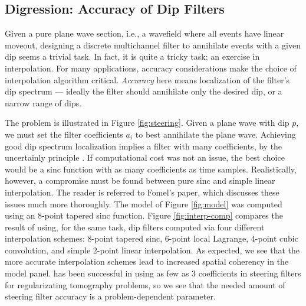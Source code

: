 

\subsection{Digression: Accuracy of Dip Filters}

Given a pure plane wave section, i.e., a wavefield where all events have linear 
moveout, designing a discrete multichannel filter to annihilate events with a given
dip seems a trivial task.  In fact, it is quite a tricky task; an exercise in
interpolation.  For many applications, accuracy considerations make the choice of 
interpolation algorithm critical.  {\em Accuracy} here means localization of the
filter's dip spectrum --- ideally the filter should annihilate only the desired
dip, or a narrow range of dips.  



The problem is illustrated in Figure \ref{fig:steering}.  Given a plane wave with
dip $p$, we must set the filter coefficients $a_i$ to best annihilate the plane wave.
Achieving good dip spectrum localization implies a filter with many coefficients, by the 
uncertainly principle \cite[]{bracewell}.  If computational cost was not an issue, the best
choice would be a sinc function with as many coefficients as time samples.
Realistically, however, a compromise must be found between pure sinc and 
simple linear interpolation.  The reader is referred to Fomel's  
paper, which discusses these issues much more
thoroughly.  The model of Figure \ref{fig:model} was computed using an 8-point
tapered sinc function.  Figure \ref{fig:interp-comp} compares
the result of using, for the same task,  dip filters computed via four different
interpolation schemes: 8-point tapered sinc, 6-point local Lagrange, 4-point cubic convolution,
and simple 2-point linear interpolation.  As expected, we see that the more 
accurate interpolation schemes lead to increased spatial coherency in the model panel.
\cite{Clapp.sep.103.bob3} has been successful in using as few as 3 coefficients in steering
filters for regularizating tomography problems, so we see that the needed amount 
of steering filter accuracy is a problem-dependent parameter.

